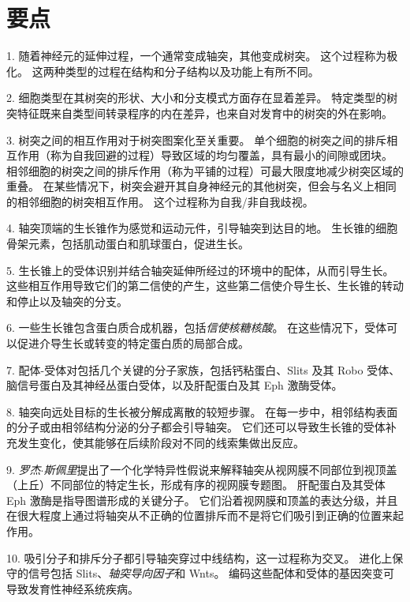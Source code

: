 \section{要点}

1. 随着神经元的延伸过程，一个通常变成轴突，其他变成树突。
这个过程称为极化。
这两种类型的过程在结构和分子结构以及功能上有所不同。 


2. 细胞类型在其树突的形状、大小和分支模式方面存在显着差异。
特定类型的树突特征既来自类型间转录程序的内在差异，也来自对发育中的树突的外在影响。


3. 树突之间的相互作用对于树突图案化至关重要。
单个细胞的树突之间的排斥相互作用（称为自我回避的过程）导致区域的均匀覆盖，具有最小的间隙或团块。
相邻细胞的树突之间的排斥作用（称为平铺的过程）可最大限度地减少树突区域的重叠。
在某些情况下，树突会避开其自身神经元的其他树突，但会与名义上相同的相邻细胞的树突相互作用。
这个过程称为自我/非自我歧视。


4. 轴突顶端的生长锥作为感觉和运动元件，引导轴突到达目的地。
生长锥的细胞骨架元素，包括肌动蛋白和肌球蛋白，促进生长。


5. 生长锥上的受体识别并结合轴突延伸所经过的环境中的配体，从而引导生长。
这些相互作用导致它们的第二信使的产生，这些第二信使介导生长、生长锥的转动和停止以及轴突的分支。


6. 一些生长锥包含蛋白质合成机器，包括\textit{信使核糖核酸}。
在这些情况下，受体可以促进介导生长或转变的特定蛋白质的局部合成。


7. 配体-受体对包括几个关键的分子家族，包括钙粘蛋白、Slits 及其 Robo 受体、脑信号蛋白及其神经丛蛋白受体，以及肝配蛋白及其 Eph 激酶受体。


8. 轴突向远处目标的生长被分解成离散的较短步骤。 在每一步中，相邻结构表面的分子或由相邻结构分泌的分子都会引导轴突。
它们还可以导致生长锥的受体补充发生变化，使其能够在后续阶段对不同的线索集做出反应。


9. \textit{罗杰$\cdot$斯佩里}提出了一个化学特异性假说来解释轴突从视网膜不同部位到视顶盖（上丘）不同部位的特定生长，形成有序的视网膜专题图。
肝配蛋白及其受体 Eph 激酶是指导图谱形成的关键分子。
它们沿着视网膜和顶盖的表达分级，并且在很大程度上通过将轴突从不正确的位置排斥而不是将它们吸引到正确的位置来起作用。


10. 吸引分子和排斥分子都引导轴突穿过中线结构，这一过程称为交叉。
进化上保守的信号包括 Slits、\textit{轴突导向因子}和 Wnts。
编码这些配体和受体的基因突变可导致发育性神经系统疾病。

